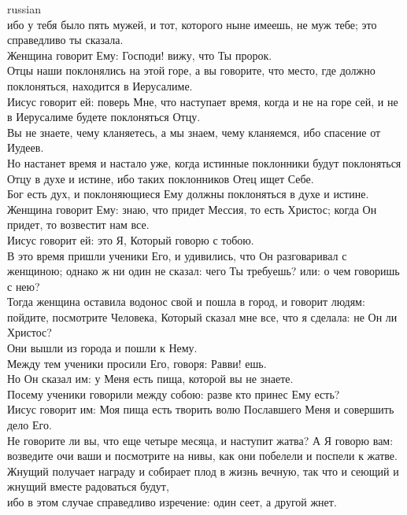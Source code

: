 \documentclass[10pt]{article} %
\begin{document}
{\begin{minipage}[t]{0.46\textwidth}
\begin{otherlanguage*}{russian}
\\
ибо у тебя было пять мужей, и тот, которого ныне имеешь, не муж тебе; это справедливо ты сказала.
\\
Женщина говорит Ему: Господи! вижу, что Ты пророк.
\\
Отцы наши поклонялись на этой горе, а вы говорите, что место, где должно поклоняться, находится в Иерусалиме.
\\
Иисус говорит ей: поверь Мне, что наступает время, когда и не на горе сей, и не в Иерусалиме будете поклоняться Отцу.
\\
Вы не знаете, чему кланяетесь, а мы знаем, чему кланяемся, ибо спасение от Иудеев.
\\
Но настанет время и настало уже, когда истинные поклонники будут поклоняться Отцу в духе и истине, ибо таких поклонников Отец ищет Себе.
\\
Бог есть дух, и поклоняющиеся Ему должны поклоняться в духе и истине.
\\
Женщина говорит Ему: знаю, что придет Мессия, то есть Христос; когда Он придет, то возвестит нам все.
\\
Иисус говорит ей: это Я, Который говорю с тобою.
\\
В это время пришли ученики Его, и удивились, что Он разговаривал с женщиною; однако ж ни один не сказал: чего Ты требуешь? или: о чем говоришь с нею?
\\
Тогда женщина оставила водонос свой и пошла в город, и говорит людям:
\\
пойдите, посмотрите Человека, Который сказал мне все, что я сделала: не Он ли Христос?
\\
Они вышли из города и пошли к Нему.
\\
Между тем ученики просили Его, говоря: Равви! ешь.
\\
Но Он сказал им: у Меня есть пища, которой вы не знаете.
\\
Посему ученики говорили между собою: разве кто принес Ему есть?
\\
Иисус говорит им: Моя пища есть творить волю Пославшего Меня и совершить дело Его.
\\
Не говорите ли вы, что еще четыре месяца, и наступит жатва? А Я говорю вам: возведите очи ваши и посмотрите на нивы, как они побелели и поспели к жатве.
\\
Жнущий получает награду и собирает плод в жизнь вечную, так что и сеющий и жнущий вместе радоваться будут,
\\
ибо в этом случае справедливо изречение: один сеет, а другой жнет.

\end{otherlanguage*}
\end{minipage}}
\end{document}
